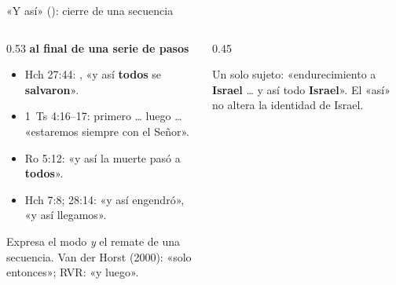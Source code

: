 \begin{frame}{«Y así» (): cierre de una secuencia}
\begin{columns}[T,onlytextwidth]
\begin{column}{0.53\textwidth}\scriptsize
\textbf{\textcolor{cafe}{ al final de una serie de pasos}}
\begin{itemize}
\item Hch 27:44: , «y así \textbf{todos} se \textbf{salvaron}».
\item 1~Ts 4:16--17: primero \ldots{} luego \ldots{}  «estaremos siempre con el Señor».
\item Ro 5:12: «y así la muerte pasó a \textbf{todos}».
\item Hch 7:8; 28:14: «y así engendró», «y así llegamos».
\end{itemize}
Expresa el modo \emph{y} el remate de una secuencia. Van der Horst (2000): «solo entonces»; RVR: «y luego».
\end{column}
\begin{column}{0.45\textwidth}
\centering
{}\elabpropia
\begin{clave}
Un solo sujeto: «endurecimiento a \textbf{Israel} \ldots{} y así todo \textbf{Israel}». El «así» no altera la identidad de Israel.
\end{clave}
\end{column}
\end{columns}
\end{frame}

